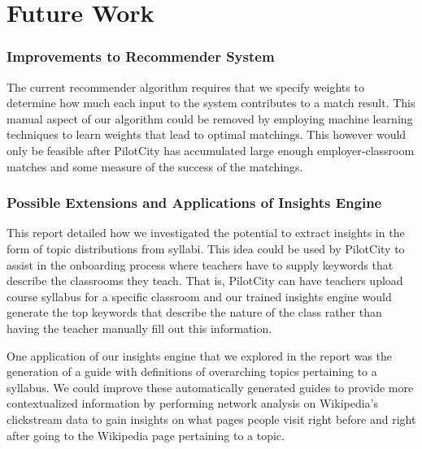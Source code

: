 
\chapter{Future Work}%
\label{sec:figs-and-tabs}

\subsection{Improvements to Recommender System}

The current recommender algorithm requires that we specify weights to determine how much each input to the system contributes to a match result. This manual aspect of our algorithm could be removed by employing machine learning techniques to learn weights that lead to optimal matchings. This however would only be feasible after PilotCity has accumulated large enough employer-classroom matches and some measure of the success of the matchings. 

\subsection{Possible Extensions and Applications of Insights Engine}
This report detailed how we investigated the potential to extract insights in the form of topic distributions from syllabi. This idea could be used by PilotCity to assist in the onboarding process where teachers have to supply keywords that describe the classrooms they teach. That is, PilotCity can have teachers upload course syllabus for a specific classroom and our trained insights engine would generate the top keywords that describe the nature of the class rather than having the teacher manually fill out this information.
\newline

One application of our insights engine that we explored in the report was the generation of a guide with definitions of overarching topics pertaining to a syllabus. We could improve these automatically generated guides to provide more contextualized information by performing network analysis on Wikipedia's clickstream data to gain insights on what pages people visit right before and right after going to the Wikipedia page pertaining to a topic.

